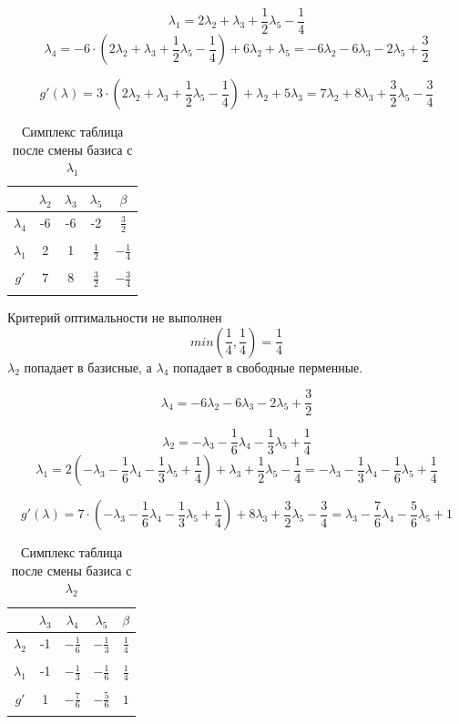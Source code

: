 \documentclass{article}
\begin{document}
\[\lambda_1 = 2\lambda_2 + \lambda_3 +\frac{1}{2}\lambda_5 -\frac{1}{4}\]
\[\lambda_4 = -6\cdot(2\lambda_2 + \lambda_3 +\frac{1}{2}\lambda_5 -\frac{1}{4}) +6\lambda_2+\lambda_5 = -6\lambda_2-6\lambda_3-2\lambda_5 +\frac{3}{2}\]

\[g'(\lambda) = 3\cdot (2\lambda_2 + \lambda_3 +\frac{1}{2}\lambda_5 -\frac{1}{4}) + \lambda_2 + 5\lambda_3 = 7\lambda_2 +8\lambda_3 +\frac{3}{2}\lambda_5 - \frac{3}{4}\]

\begin{table}[H]
    \centering
    \caption{Симплекс таблица после смены базиса с $\lambda_1$}
    \begin{tabular}{|c|c|c|c|c|}
    \hline
    &$\lambda_2$&$\lambda_3$&$\lambda_5$&$\beta$\\\hline
    $\lambda_4$&-6&-6&-2&$\frac{3}{2}$\\
    &&&&\\\hline
    $\lambda_1$&2&1&$\frac{1}{2}$&$-\frac{1}{4}$\\
    &&&&\\\hline
    $g'$&7&8&$\frac{3}{2}$&$-\frac{3}{4}$\\
    &&&&\\\hline
    \end{tabular}
\end{table}
Критерий оптимальности не выполнен 
\[min(\frac{1}{4}, \frac{1}{4}) = \frac{1}{4}\]
$\lambda_2$ попадает в базисные, а $\lambda_4$ попадает в свободные перменные.

\[\lambda_4 = -6\lambda_2-6\lambda_3-2\lambda_5 +\frac{3}{2}\]

\[\lambda_2 = -\lambda_3 - \frac{1}{6}\lambda_4 - \frac{1}{3}\lambda_5 +\frac{1}{4}\]
\[\lambda_1 = 2(-\lambda_3 - \frac{1}{6}\lambda_4 - \frac{1}{3}\lambda_5 +\frac{1}{4})+ \lambda_3 +\frac{1}{2}\lambda_5 -\frac{1}{4} =
-\lambda_3 - \frac{1}{3}\lambda_4 - \frac{1}{6}\lambda_5 + \frac{1}{4}\]

\[g'(\lambda) = 7\cdot(-\lambda_3 - \frac{1}{6}\lambda_4 - \frac{1}{3}\lambda_5 +\frac{1}{4}) +8\lambda_3 +\frac{3}{2}\lambda_5 - \frac{3}{4} = \lambda_3 - \frac{7}{6}\lambda_4 - \frac{5}{6}\lambda_5 +1 \]

\begin{table}[H]
    \centering
    \caption{Симплекс таблица после смены базиса с $\lambda_2$}
    \begin{tabular}{|c|c|c|c|c|}
    \hline
    &$\lambda_3$&$\lambda_4$&$\lambda_5$&$\beta$\\\hline
    $\lambda_2$&-1&$-\frac{1}{6}$&$-\frac{1}{3}$&$\frac{1}{4}$\\
    &&&&\\\hline
    $\lambda_1$&-1&$-\frac{1}{3}$&$-\frac{1}{6}$&$\frac{1}{4}$\\
    &&&&\\\hline
    $g'$&1&$-\frac{7}{6}$&$-\frac{5}{6}$&$1$\\
    &&&&\\\hline
    \end{tabular}
\end{table}
\end{document}
